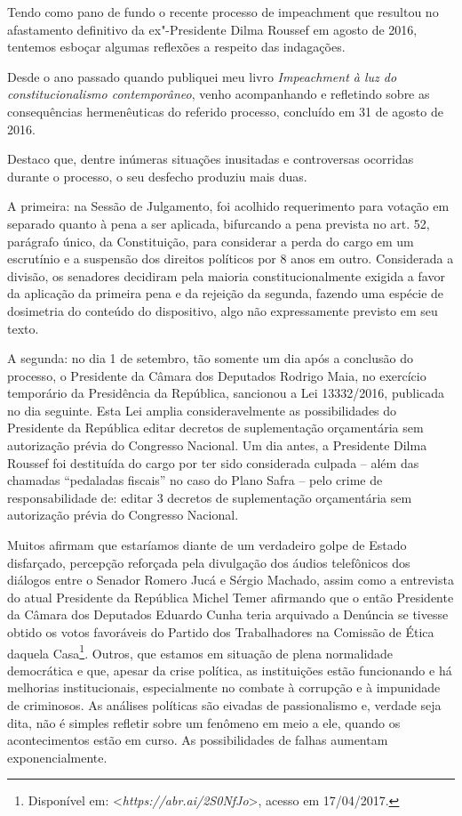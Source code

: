 Tendo como pano de fundo o recente processo de impeachment que
resultou no afastamento definitivo da ex"-Presidente Dilma Roussef em
agosto de 2016, tentemos esboçar algumas reflexões a respeito das
indagações.

Desde o ano passado quando publiquei meu livro \emph{Impeachment à
luz do constitucionalismo contemporâneo}, venho acompanhando e
refletindo sobre as consequências hermenêuticas do referido processo,
concluído em 31 de agosto de 2016.

Destaco que, dentre inúmeras situações inusitadas e controversas
ocorridas durante o processo, o seu desfecho produziu mais duas.

A primeira: na Sessão de Julgamento, foi acolhido requerimento para
votação em separado quanto à pena a ser aplicada, bifurcando a pena
prevista no art. 52, parágrafo único, da Constituição, para considerar a
perda do cargo em um escrutínio e a suspensão dos direitos políticos por
8 anos em outro. Considerada a divisão, os senadores decidiram pela
maioria constitucionalmente exigida a favor da aplicação da primeira
pena e da rejeição da segunda, fazendo uma espécie de dosimetria do
conteúdo do dispositivo, algo não expressamente previsto em seu texto.

A segunda: no dia 1 de setembro, tão somente um dia após a conclusão do
processo, o Presidente da Câmara dos Deputados Rodrigo Maia, no
exercício temporário da Presidência da República, sancionou a Lei
13332/2016, publicada no dia seguinte. Esta Lei amplia consideravelmente
as possibilidades do Presidente da República editar decretos de
suplementação orçamentária sem autorização prévia do Congresso Nacional.
Um dia antes, a Presidente Dilma Roussef foi destituída do cargo por ter
sido considerada culpada -- além das chamadas ``pedaladas fiscais'' no
caso do Plano Safra -- pelo crime de responsabilidade de: editar 3
decretos de suplementação orçamentária sem autorização prévia do
Congresso Nacional.

Muitos afirmam que estaríamos diante de um verdadeiro golpe de Estado
disfarçado, percepção reforçada pela divulgação dos áudios telefônicos
dos diálogos entre o Senador Romero Jucá e Sérgio Machado, assim como a
entrevista do atual Presidente da República Michel Temer afirmando que o
então Presidente da Câmara dos Deputados Eduardo Cunha teria arquivado a
Denúncia se tivesse obtido os votos favoráveis do Partido dos
Trabalhadores na Comissão de Ética daquela Casa\footnote{Disponível em: \textless{}\emph{https://abr.ai/2S0NfJo}\textgreater{}, acesso em 17/04/2017.}. Outros, que estamos em situação de plena
normalidade democrática e que, apesar da crise política, as instituições
estão funcionando e há melhorias institucionais, especialmente no
combate à corrupção e à impunidade de criminosos. As análises políticas
são eivadas de passionalismo e, verdade seja dita, não é simples
refletir sobre um fenômeno em meio a ele, quando os acontecimentos estão
em curso. As possibilidades de falhas aumentam exponencialmente.

